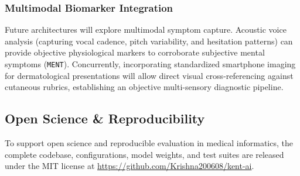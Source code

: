 \subsubsection{Multimodal Biomarker Integration}
Future architectures will explore multimodal symptom capture. Acoustic voice analysis (capturing vocal cadence, pitch variability, and hesitation patterns) can provide objective physiological markers to corroborate subjective mental symptoms (\texttt{MENT}). Concurrently, incorporating standardized smartphone imaging for dermatological presentations will allow direct visual cross-referencing against cutaneous rubrics, establishing an objective multi-sensory diagnostic pipeline.

\subsection{Open Science \& Reproducibility}

To support open science and reproducible evaluation in medical informatics, the complete codebase, configurations, model weights, and test suites are released under the MIT license at \url{https://github.com/Krishna200608/kent-ai}.
